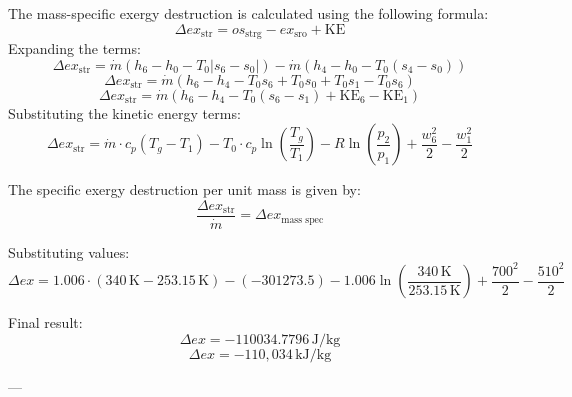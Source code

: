 The mass-specific exergy destruction is calculated using the following formula:  
\[
\Delta ex_{\text{str}} = os_{\text{strg}} - ex_{\text{sro}} + \text{KE}
\]  
Expanding the terms:  
\[
\Delta ex_{\text{str}} = \dot{m} \left( h_6 - h_0 - T_0 \left| s_6 - s_0 \right| \right) - \dot{m} \left( h_4 - h_0 - T_0 \left( s_4 - s_0 \right) \right)
\]  
\[
\Delta ex_{\text{str}} = \dot{m} \left( h_6 - h_4 - T_0 s_6 + T_0 s_0 + T_0 s_1 - T_0 s_6 \right)
\]  
\[
\Delta ex_{\text{str}} = \dot{m} \left( h_6 - h_4 - T_0 \left( s_6 - s_1 \right) + \text{KE}_6 - \text{KE}_1 \right)
\]  
Substituting the kinetic energy terms:  
\[
\Delta ex_{\text{str}} = \dot{m} \cdot c_p \left( T_g - T_1 \right) - T_0 \cdot c_p \ln \left( \frac{T_g}{T_1} \right) - R \ln \left( \frac{p_2}{p_1} \right) + \frac{w_6^2}{2} - \frac{w_1^2}{2}
\]  

The specific exergy destruction per unit mass is given by:  
\[
\frac{\Delta ex_{\text{str}}}{\dot{m}} = \Delta ex_{\text{mass spec}}
\]  

Substituting values:  
\[
\Delta ex = 1.006 \cdot \left( 340 \, \text{K} - 253.15 \, \text{K} \right) - \left( -301273.5 \right) - 1.006 \ln \left( \frac{340 \, \text{K}}{253.15 \, \text{K}} \right) + \frac{700^2}{2} - \frac{510^2}{2}
\]  

Final result:  
\[
\Delta ex = -110034.7796 \, \text{J/kg}
\]  
\[
\Delta ex = -110,034 \, \text{kJ/kg}
\]  

---